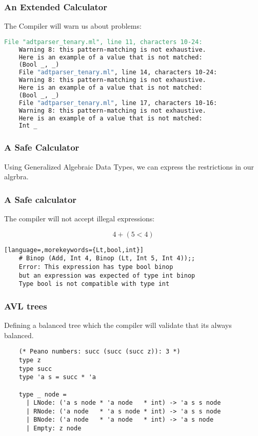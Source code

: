 \documentclass[xcolor=svgnames]{beamer}
\renewcommand{\_}{\mathunderscore}
\begin{document}
\begin{frame}[fragile]
  \frametitle{An Extended Calculator}
  The Compiler will warn us about problems:
  \begin{lstlisting}[basicstyle={\footnotesize\ttfamily},language=make]
    File "adtparser_tenary.ml", line 11, characters 10-24:
    Warning 8: this pattern-matching is not exhaustive.
    Here is an example of a value that is not matched:
    (Bool _, _)
    File "adtparser_tenary.ml", line 14, characters 10-24:
    Warning 8: this pattern-matching is not exhaustive.
    Here is an example of a value that is not matched:
    (Bool _, _)
    File "adtparser_tenary.ml", line 17, characters 10-16:
    Warning 8: this pattern-matching is not exhaustive.
    Here is an example of a value that is not matched:
    Int _
  \end{lstlisting}

\end{frame}

\begin{frame}[fragile]
  \frametitle{A Safe Calculator}
  Using Generalized Algebraic Data Types, we can express the
  restrictions in our algrbra.

  
\end{frame}

\begin{frame}[fragile]
  \frametitle{A Safe calculator}
  The compiler will not accept illegal expressions:

  \[4 + (5 < 4)\]

  \begin{lstlisting}[language=,morekeywords={Lt,bool,int}]
    # Binop (Add, Int 4, Binop (Lt, Int 5, Int 4));;
    Error: This expression has type bool binop
    but an expression was expected of type int binop
    Type bool is not compatible with type int
  \end{lstlisting}

\end{frame}

\begin{frame}[fragile]
  \frametitle{AVL trees}
  Defining a balanced tree which the compiler will validate that its
  always balanced.

  \begin{lstlisting}
    (* Peano numbers: succ (succ (succ z)): 3 *)
    type z
    type succ
    type 'a s = succ * 'a

    type _ node =
      | LNode: ('a s node * 'a node   * int) -> 'a s s node
      | RNode: ('a node   * 'a s node * int) -> 'a s s node
      | BNode: ('a node   * 'a node   * int) -> 'a s node
      | Empty: z node
  \end{lstlisting}

\end{frame}
\end{document}
